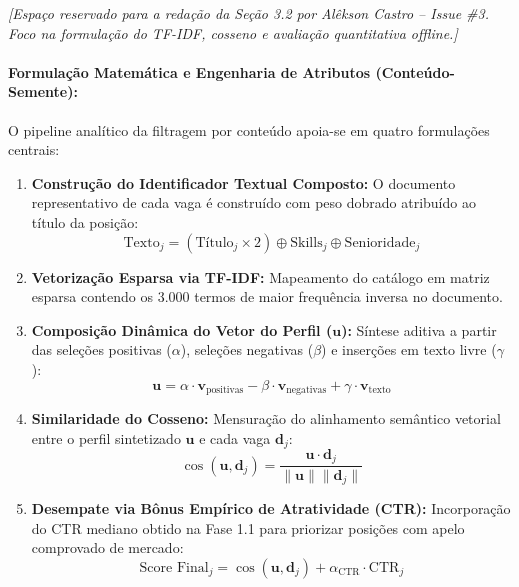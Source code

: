 \noindent\textit{[Espaço reservado para a redação da Seção 3.2 por Alêkson Castro -- Issue \#3. Foco na formulação do TF-IDF, cosseno e avaliação quantitativa offline.]}

\paragraph{Formulação Matemática e Engenharia de Atributos (Conteúdo-Semente):}
O pipeline analítico da filtragem por conteúdo apoia-se em quatro formulações centrais:

\begin{enumerate}[label=\alph*)]
    \item \textbf{Construção do Identificador Textual Composto:} O documento representativo de cada vaga é construído com peso dobrado atribuído ao título da posição:
    \begin{equation}
        \text{Texto}_j = (\text{Título}_j \times 2) \oplus \text{Skills}_j \oplus \text{Senioridade}_j
    \end{equation}
    \item \textbf{Vetorização Esparsa via TF-IDF:} Mapeamento do catálogo em matriz esparsa contendo os 3.000 termos de maior frequência inversa no documento.
    \item \textbf{Composição Dinâmica do Vetor do Perfil ($\mathbf{u}$):} Síntese aditiva a partir das seleções positivas ($\alpha$), seleções negativas ($\beta$) e inserções em texto livre ($\gamma$):
    \begin{equation}
        \mathbf{u} = \alpha \cdot \mathbf{v}_{\text{positivas}} - \beta \cdot \mathbf{v}_{\text{negativas}} + \gamma \cdot \mathbf{v}_{\text{texto}}
    \end{equation}
    \item \textbf{Similaridade do Cosseno:} Mensuração do alinhamento semântico vetorial entre o perfil sintetizado $\mathbf{u}$ e cada vaga $\mathbf{d}_j$:
    \begin{equation}
        \cos(\mathbf{u}, \mathbf{d}_j) = \frac{\mathbf{u} \cdot \mathbf{d}_j}{\|\mathbf{u}\| \|\mathbf{d}_j\|}
    \end{equation}
    \item \textbf{Desempate via Bônus Empírico de Atratividade (CTR):} Incorporação do CTR mediano obtido na Fase 1.1 para priorizar posições com apelo comprovado de mercado:
    \begin{equation}
        \text{Score Final}_j = \cos(\mathbf{u}, \mathbf{d}_j) + \alpha_{\text{CTR}} \cdot \text{CTR}_j
    \end{equation}
\end{enumerate}

